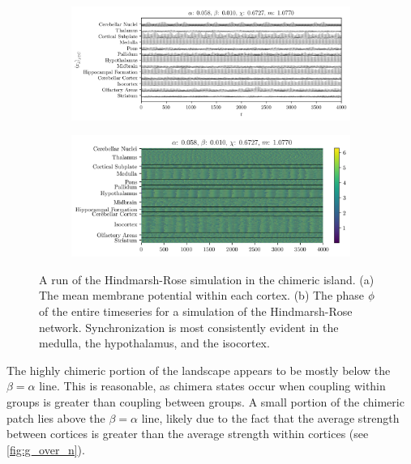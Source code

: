 \begin{figure}[ht]
  \centering
  \begin{subfigure}{\textwidth}
    \includegraphics[width=\textwidth]{figure/means-0_058-0_010}
    \caption{}
    \label{fig:mean_058_010}
  \end{subfigure}
  \begin{subfigure}{\textwidth}
    \includegraphics[width=\textwidth]{figure/overhead-0_058-0_010}
    \caption{}
    \label{fig:overhead_058_010}
  \end{subfigure}
  \caption[Highly chimeric simulation]{A run of the Hindmarsh-Rose simulation in the chimeric island.
    (a) The mean membrane potential within each cortex.
    (b) The phase $\phi$ of the entire timeseries for a simulation of the Hindmarsh-Rose network.
    Synchronization is most consistently evident in the medulla, the hypothalamus, and the isocortex.
  }
  \label{fig:058_010}
\end{figure}

The highly chimeric portion of the landscape appears to be mostly below the $\beta = \alpha$ line.
This is reasonable, as chimera states occur when coupling within groups is greater than coupling between groups.
A small portion of the chimeric patch lies above the $\beta = \alpha$ line, likely due to the fact that the average strength between cortices is greater than the average strength within cortices (see \cref{fig:g_over_n}).


